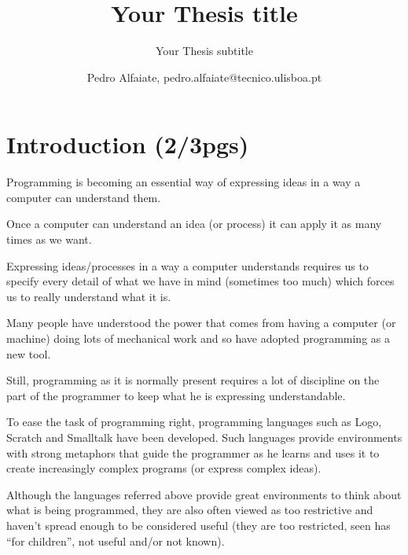 \documentclass{./llncs2e/llncs}
\begin{document}
\title{Your Thesis title}

\subtitle{Your Thesis subtitle}
\author{Pedro Alfaiate, pedro.alfaiate@tecnico.ulisboa.pt}

\maketitle

\begin{abstract}

\end{abstract}
\begin{keywords}

\end{keywords}
\section{Introduction (2/3pgs)}
Programming is becoming an essential way of expressing ideas in a way a computer can understand them.

Once a computer can understand an idea (or process) it can apply it as many times as we want.

Expressing ideas/processes in a way a computer understands requires us to specify every detail of what we have in mind (sometimes too much) which forces us to really understand what it is.

Many people have understood the power that comes from having a computer (or machine) doing lots of mechanical work and so have adopted programming as a new tool.

Still, programming as it is normally present requires a lot of discipline on the part of the programmer to keep what he is expressing understandable.

To ease the task of programming right, programming languages such as Logo\cite{papert1999logo}, Scratch\cite{Resnick:2009:SP:1592761.1592779} and Smalltalk\cite{goldberg1983smalltalk} have been developed. Such languages provide environments with strong metaphors that guide the programmer as he learns and uses it to create increasingly complex programs (or express complex ideas).

Although the languages referred above provide great environments to think about what is being programmed, they are also often viewed as too restrictive and haven't spread enough to be considered useful (they are too restricted, seen has ``for children'', not useful and/or not known).
\end{document}
